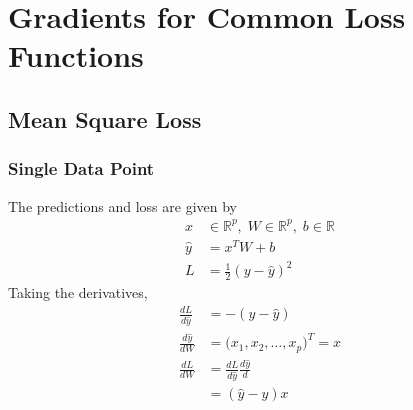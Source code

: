 \documentclass[../../deep_learning_notes.tex]{subfiles}
\begin{document}
\section{Gradients for Common Loss Functions}
\subsection{Mean Square Loss}
\subsubsection*{Single Data Point}
The predictions and loss are given by
\begin{align*}
    x &\in \mathbb{R}^{p}, \; W \in \mathbb{R}^{p}, \; b \in \mathbb{R}\\
    \hat{y} &= x^{T}W + b\\
    L &= \frac{1}{2}(y - \hat{y})^{2}
\end{align*}
Taking the derivatives,
\begin{align*}
    \frac{dL}{d\hat{y}} &= -(y - \hat{y})\\
    \frac{d\hat{y}}{dW} &= \big( x_{1}, x_{2}, \ldots, x_{p} \big)^{T} = x\\
    \frac{dL}{dW} &= \frac{dL}{d\hat{y}} \frac{d\hat{y}}{d}\\
    &= (\hat{y} - y) x
\end{align*}


\end{document}
